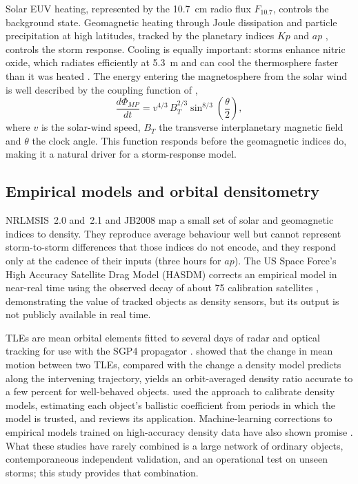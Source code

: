 \documentclass[11pt]{article}
\newcommand{\Kp}{\mathit{Kp}}
\newcommand{\ap}{\mathit{ap}}
\begin{document}
Solar EUV heating, represented by the 10.7~cm radio flux $F_{10.7}$, controls the background state. Geomagnetic heating through Joule dissipation and particle precipitation at high latitudes, tracked by the planetary indices $\Kp$ and $\ap$ \citep{matzka2021}, controls the storm response. Cooling is equally important: storms enhance nitric oxide, which radiates efficiently at 5.3~\textmu m and can cool the thermosphere faster than it was heated \citep{mlynczak2003}. The energy entering the magnetosphere from the solar wind is well described by the coupling function of \citet{newell2007},
\begin{equation}
\frac{d\Phi_{MP}}{dt} = v^{4/3}\, B_T^{2/3} \sin^{8/3}\!\left(\frac{\theta}{2}\right),
\label{eq:newell}
\end{equation}
where $v$ is the solar-wind speed, $B_T$ the transverse interplanetary magnetic field and $\theta$ the clock angle. This function responds before the geomagnetic indices do, making it a natural driver for a storm-response model.

\subsection{Empirical models and orbital densitometry}
NRLMSIS~2.0 and~2.1 \citep{emmert2021,emmert2022} and JB2008 \citep{bowman2008} map a small set of solar and geomagnetic indices to density. They reproduce average behaviour well but cannot represent storm-to-storm differences that those indices do not encode, and they respond only at the cadence of their inputs (three hours for $\ap$). The US Space Force's High Accuracy Satellite Drag Model (HASDM) corrects an empirical model in near-real time using the observed decay of about 75 calibration satellites \citep{storz2005}, demonstrating the value of tracked objects as density sensors, but its output is not publicly available in real time.

TLEs are mean orbital elements fitted to several days of radar and optical tracking for use with the SGP4 propagator \citep{vallado2006}. \citet{picone2005} showed that the change in mean motion between two TLEs, compared with the change a density model predicts along the intervening trajectory, yields an orbit-averaged density ratio accurate to a few percent for well-behaved objects. \citet{doornbos2008} used the approach to calibrate density models, estimating each object's ballistic coefficient from periods in which the model is trusted, and \citet{emmert2015} reviews its application. Machine-learning corrections to empirical models trained on high-accuracy density data have also shown promise \citep{licata2022}. What these studies have rarely combined is a large network of ordinary objects, contemporaneous independent validation, and an operational test on unseen storms; this study provides that combination.
\end{document}
